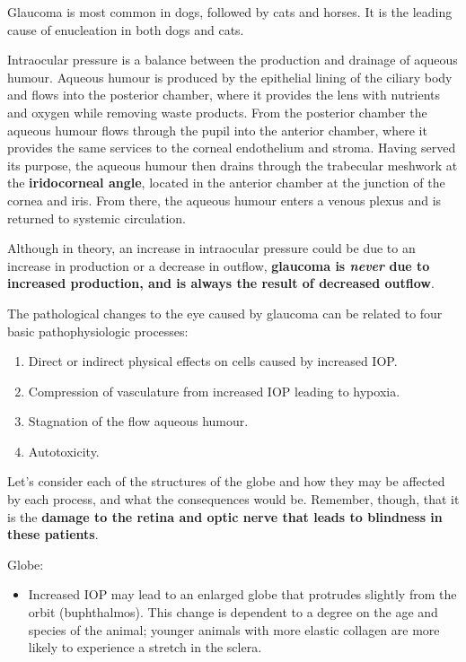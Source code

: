 \documentclass[openany]{book}
\providecommand{\tightlist}{%
  \setlength{\itemsep}{0pt}\setlength{\parskip}{0pt}}
\begin{document}
Glaucoma is most common in dogs, followed by cats and horses. It is the
leading cause of enucleation in both dogs and cats.

Intraocular pressure is a balance between the production and drainage of
aqueous humour. Aqueous humour is produced by the epithelial lining of
the ciliary body and flows into the posterior chamber, where it provides
the lens with nutrients and oxygen while removing waste products. From
the posterior chamber the aqueous humour flows through the pupil into
the anterior chamber, where it provides the same services to the corneal
endothelium and stroma. Having served its purpose, the aqueous humour
then drains through the trabecular meshwork at the \textbf{iridocorneal
angle}, located in the anterior chamber at the junction of the cornea
and iris. From there, the aqueous humour enters a venous plexus and is
returned to systemic circulation.

Although in theory, an increase in intraocular pressure could be due to
an increase in production or a decrease in outflow, \textbf{glaucoma is
\emph{never} due to increased production, and is always the result of
decreased outflow}.

The pathological changes to the eye caused by glaucoma can be related to
four basic pathophysiologic processes:

\begin{enumerate}
\def\labelenumi{\arabic{enumi}.}
\tightlist
\item
  Direct or indirect physical effects on cells caused by increased IOP.
\item
  Compression of vasculature from increased IOP leading to hypoxia.
\item
  Stagnation of the flow aqueous humour.
\item
  Autotoxicity.
\end{enumerate}

Let's consider each of the structures of the globe and how they may be
affected by each process, and what the consequences would be. Remember,
though, that it is the \textbf{damage to the retina and optic nerve that
leads to blindness in these patients}.

Globe:

\begin{itemize}
\tightlist
\item
  Increased IOP may lead to an enlarged globe that protrudes slightly
  from the orbit (buphthalmos). This change is dependent to a degree on
  the age and species of the animal; younger animals with more elastic
  collagen are more likely to experience a stretch in the sclera.
\end{itemize}
\end{document}
